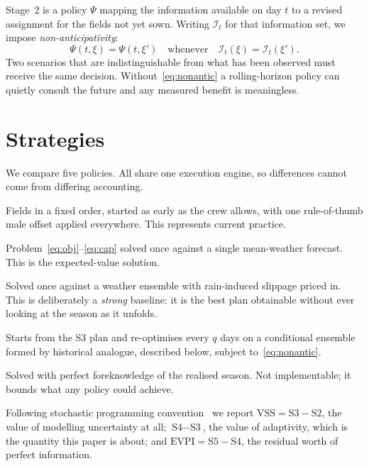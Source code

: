 \documentclass[10pt,twocolumn]{article}
\newcommand{\EVPI}{\mathrm{EVPI}}
\newcommand{\VSS}{\mathrm{VSS}}
\begin{document}
Stage~2 is a policy $\Psi$ mapping the information available on day $t$ to a
revised assignment for the fields not yet sown. Writing $\mathcal{I}_t$ for
that information set, we impose \emph{non-anticipativity}:
\begin{equation}
\Psi(t,\xi) = \Psi(t,\xi') \quad \text{whenever} \quad
\mathcal{I}_t(\xi) = \mathcal{I}_t(\xi').
\label{eq:nonantic}
\end{equation}
Two scenarios that are indistinguishable from what has been observed must
receive the same decision. Without~\eqref{eq:nonantic} a rolling-horizon
policy can quietly consult the future and any measured benefit is
meaningless.

\section{Strategies}

We compare five policies. All share one execution engine, so differences
cannot come from differing accounting.

\begin{description}
\itemsep1pt
\item[\textbf{S1 Conventional.}] Fields in a fixed order, started as early as
the crew allows, with one rule-of-thumb male offset applied everywhere. This
represents current practice.
\item[\textbf{S2 Static (EV).}] Problem~\eqref{eq:obj}--\eqref{eq:cap} solved
once against a single mean-weather forecast. This is the expected-value
solution.
\item[\textbf{S3 Static (robust).}] Solved once against a weather ensemble
with rain-induced slippage priced in. This is deliberately a \emph{strong}
baseline: it is the best plan obtainable without ever looking at the season
as it unfolds.
\item[\textbf{S4 Dynamic.}] Starts from the S3 plan and re-optimises every
$q$ days on a conditional ensemble formed by historical analogue, described
below, subject to~\eqref{eq:nonantic}.
\item[\textbf{S5 Wait-and-see.}] Solved with perfect foreknowledge of the
realised season. Not implementable; it bounds what any policy could achieve.
\end{description}

Following stochastic programming convention~\cite{birge} we report
$\VSS = \text{S3} - \text{S2}$, the value of modelling uncertainty at all;
$\text{S4} - \text{S3}$, the value of adaptivity, which is the quantity this
paper is about; and $\EVPI = \text{S5} - \text{S4}$, the residual worth of
perfect information.
\end{document}
